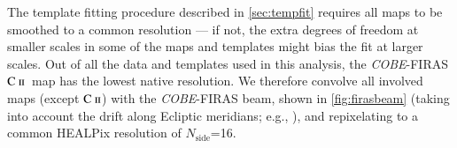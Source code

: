 \documentclass{aa}
\newcommand{\mathsc}[1]{{\normalfont\textsc{#1}}}
\def\Planck{\textit{Planck}}
\def\COBE{\textit{COBE}}
\def\nside{$N_{\mathrm{side}}$}
\newcommand{\CII}{\ensuremath{\mathsc{C\ ii}}}
\begin{document}
%
%


The template fitting procedure described in \cref{sec:tempfit}
requires all maps to be smoothed to a common resolution --- if not, the
extra degrees of freedom at smaller scales in some of the maps and
templates might bias the fit at larger scales. Out of all the data and
templates used in this analysis, the \COBE-FIRAS \CII\ map has the lowest native resolution. We therefore convolve all involved
maps (except \CII) with the \COBE-FIRAS beam, shown in \cref{fig:firasbeam} (taking
into account the drift along Ecliptic meridians; e.g., \citealp{odegard:2019}), and repixelating to a common HEALPix
resolution of \nside=16.
\end{document}
